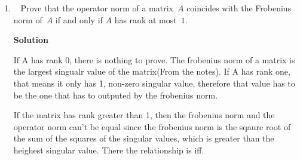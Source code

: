 \documentclass[11pt]{article}
\newcommand\score[1]{\marginpar{\vspace{-2ex}\color{blue}{#1/3}}\hspace{-1ex}}
\newcommand\0{\mathbf{0}}
\newcommand\<{\langle}
\renewcommand\>{\rangle}
\begin{document}
\begin{enumerate}
The eigenvalues of are 16 and 1, therefore the singular values are 
4 and 1. Therefore the norm operator is 4, and the minimum length of unit vectors
is 1.

The eigen valeus of $A^{T}A$ are $(1,2)$ and $(-2,1)$ for the singular values 4 and 1 
respectively. So the vector that achieve the maximum and the minimum are precisely the normalized version of 
this vectors.

From this we also find $V^{*}$.

$$
V=\begin{bmatrix}
  1/\sqrt5 & -2/\sqrt5\\
  2/\sqrt5& 1/\sqrt{5}
\end{bmatrix}
$$

To W we just do $w_[i]=\frac{1}{\sigma_{i}}A v_{i}$.

$$
W=\begin{bmatrix}
  2/\sqrt5 & -1/\sqrt5\\
  -1/\sqrt5 & 2/\sqrt5
\end{bmatrix}
$$
So $A=W \Sigma V^{*}$, where $\Sigma$ is a just an operator is the singular values in the diagonal.

\item\ \score{}%
Prove that the operator norm of a matrix~$A$ coincides with the
Frobenius norm of~$A$ if and only if $A$ has rank at most~$1$.

\textbf{Solution}

If A has rank 0, there is nothing to prove. The frobenius norm of a matrix is
the largest singualr value of the matrix(From the notes). If A has rank one, that
means it only has 1, non-zero singular value, therefore that value has to be the 
one that has to outputed by the frobenius norm.

If the matrix has rank greater than 1, then the frobenius norm and the 
operator norm can't be equal since the frobenius norm is the sqaure root of the sum 
of the squares of the singular values, which is greater than
the heighest singular value. There the relationship is iff.

\end{enumerate}


\end{document}
